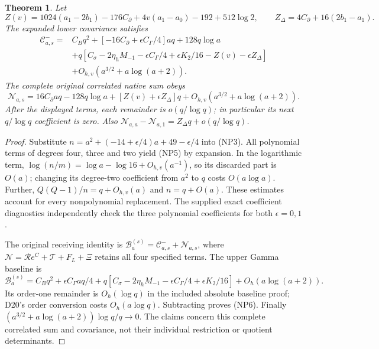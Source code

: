 \documentclass[11pt]{article}
\newtheorem{theorem}{Theorem}
\begin{document}
\begin{theorem}
Let
\[
 Z(v)=1024(a_1-2b_1)-176C_\partial+4v(a_1-a_0)-192+512\log2,
 \qquad Z_\Delta=4C_\partial+16(2b_1-a_1).
 \tag{NP4}
\]
The expanded lower covariance satisfies
\[
\begin{aligned}
\mathcal C^-_{a,s}={}&C_Bq^2+[-16C_\partial+\epsilon C_\Gamma/4]aq
+128q\log a\\
&+q[C_\sigma-2\eta_hM_{-1}-\epsilon C_\Gamma/4
+\epsilon K_2/16-Z(v)-\epsilon Z_\Delta]\\
&+O_{h,v}(a^{3/2}+a\log(a+2)).
\end{aligned}\tag{NP5}
\]
The complete original correlated native sum obeys
\[
 \mathcal N_{a,s}=16C_\partial aq-128q\log a
    +[Z(v)+\epsilon Z_\Delta]q
       +O_{h,v}(a^{3/2}+a\log(a+2)). \tag{NP6}
\]
After the displayed terms, each remainder is $o(q/\log q)$; in
particular its next $q/\log q$ coefficient is zero. Also
$\mathcal N_{a,a}-\mathcal N_{a,1}=Z_\Delta q+o(q/\log q)$.
\end{theorem}
\begin{proof}
Substitute $n=a^2+(-14+\epsilon/4)a+49-\epsilon/4$ into (NP3).
All polynomial terms of degrees four, three and two yield (NP5)
by expansion. In the logarithmic term,
$\log(n/m)=\log a-\log16+O_{h,v}(a^{-1})$,
so its discarded part is $O(a)$; changing its degree-two coefficient
from $a^2$ to $q$ costs $O(a\log a)$. Further,
$Q(Q-1)/n=q+O_{h,v}(a)$ and $n=q+O(a)$. These estimates account
for every nonpolynomial replacement. The supplied exact coefficient
diagnostics independently check the three polynomial coefficients
for both $\epsilon=0,1$.

The original receiving identity is
$\mathcal B_a^{(s)}=\mathcal C^-_{a,s}+\mathcal N_{a,s}$, where
$\mathcal N=\mathcal Re^C+\mathcal T+F_L+\Xi$ retains all four
specified terms. The upper Gamma baseline is
\[
 \mathcal B_a^{(s)}=C_Bq^2+\epsilon C_\Gamma aq/4
 +q[C_\sigma-2\eta_hM_{-1}-\epsilon C_\Gamma/4+\epsilon K_2/16]
 +O_h(a\log(a+2)).
\]
Its order-one remainder is $O_h(\log q)$ in the included absolute
baseline proof; D20's order conversion costs $O_h(a\log q)$.
Subtracting proves (NP6). Finally
$(a^{3/2}+a\log(a+2))\log q/q\to0$. The claims concern this
complete correlated sum and covariance, not their individual
restriction or quotient determinants.
\end{proof}
\end{document}
